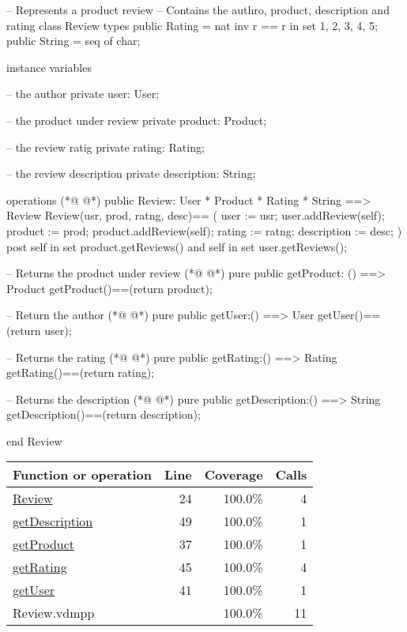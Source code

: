\begin{vdmpp}[breaklines=true]
-- Represents a product review
-- Contains the authro, product, description and rating
class Review
 types
  public Rating = nat 
  inv r == r in set {1, 2, 3, 4, 5};
  public String = seq of char;

 instance variables
 
  -- the author
   private user: User;
   
   -- the product under review
   private product: Product;
   
   -- the review ratig
  private rating: Rating;
  
  -- the review description
  private description: String;
  
 operations
(*@
\label{Review:24}
@*)
  public Review: User * Product * Rating * String ==> Review
  Review(usr, prod, ratng, desc)==
  (
   user := usr;
   user.addReview(self);
   product := prod;
   product.addReview(self);
   rating := ratng;
   description := desc;
  ) post self in set product.getReviews() and 
   self in set user.getReviews();
 
  -- Returns the product under review
(*@
\label{getProduct:37}
@*)
  pure public getProduct: () ==> Product
  getProduct()==(return product);
  
  -- Return the author
(*@
\label{getUser:41}
@*)
  pure public getUser:() ==> User
  getUser()==(return user);
  
  -- Returns the rating
(*@
\label{getRating:45}
@*)
  pure public getRating:() ==> Rating
  getRating()==(return rating);
  
  -- Returns the description
(*@
\label{getDescription:49}
@*)
  pure public getDescription:() ==> String
  getDescription()==(return description);
 
end Review
\end{vdmpp}
\bigskip
\begin{longtable}{|l|r|r|r|}
\hline
Function or operation & Line & Coverage & Calls \\
\hline
\hline
\hyperref[Review:24]{Review} & 24&100.0\% & 4 \\
\hline
\hyperref[getDescription:49]{getDescription} & 49&100.0\% & 1 \\
\hline
\hyperref[getProduct:37]{getProduct} & 37&100.0\% & 1 \\
\hline
\hyperref[getRating:45]{getRating} & 45&100.0\% & 4 \\
\hline
\hyperref[getUser:41]{getUser} & 41&100.0\% & 1 \\
\hline
\hline
Review.vdmpp & & 100.0\% & 11 \\
\hline
\end{longtable}

